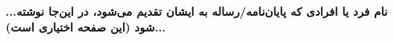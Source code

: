 \textbf{...نام فرد یا افرادی که پایان‌نامه/رساله به ایشان تقدیم می‌شود، در این‌جا نوشته شود (این صفحه اختیاری است)...}
